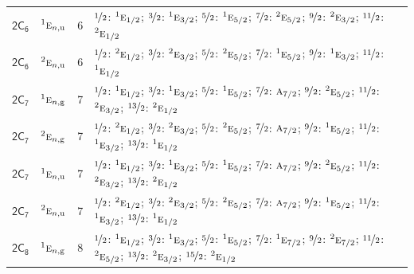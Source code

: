\documentclass[10pt,a4paper]{article}
\numberwithin{equation}{section}
\newcommand{\grp}[1]{\mathsf{#1}}
\newcommand{\irr}[1]{\text{\normalfont\scshape #1}}
\newcommand{\conjpair}[1]{{}^{#1}}
\newcommand{\ptag}[1]{\mathrm{#1}}
\newlength{\fillwidth}\newlength{\cellwidth}\newlength{\colwidth}
\begin{document}
{\begin{longtable}{@{}llr>{\RaggedRight\arraybackslash}p{\fillwidth}@{}}
\href{2C6.pdf}{$\grp{2C_{6}}$} & $\conjpair{1}\irr{e}_{n,\ptag{u}}$ & 6 & $\nicefrac{1}{2}$: $\conjpair{1}\irr{e}_{1/2}$; $\nicefrac{3}{2}$: $\conjpair{1}\irr{e}_{3/2}$; $\nicefrac{5}{2}$: $\conjpair{1}\irr{e}_{5/2}$; $\nicefrac{7}{2}$: $\conjpair{2}\irr{e}_{5/2}$; $\nicefrac{9}{2}$: $\conjpair{2}\irr{e}_{3/2}$; $\nicefrac{11}{2}$: $\conjpair{2}\irr{e}_{1/2}$\\
\href{2C6.pdf}{$\grp{2C_{6}}$} & $\conjpair{2}\irr{e}_{n,\ptag{u}}$ & 6 & $\nicefrac{1}{2}$: $\conjpair{2}\irr{e}_{1/2}$; $\nicefrac{3}{2}$: $\conjpair{2}\irr{e}_{3/2}$; $\nicefrac{5}{2}$: $\conjpair{2}\irr{e}_{5/2}$; $\nicefrac{7}{2}$: $\conjpair{1}\irr{e}_{5/2}$; $\nicefrac{9}{2}$: $\conjpair{1}\irr{e}_{3/2}$; $\nicefrac{11}{2}$: $\conjpair{1}\irr{e}_{1/2}$\\
\href{2C7.pdf}{$\grp{2C_{7}}$} & $\conjpair{1}\irr{e}_{n,\ptag{g}}$ & 7 & $\nicefrac{1}{2}$: $\conjpair{1}\irr{e}_{1/2}$; $\nicefrac{3}{2}$: $\conjpair{1}\irr{e}_{3/2}$; $\nicefrac{5}{2}$: $\conjpair{1}\irr{e}_{5/2}$; $\nicefrac{7}{2}$: $\irr{a}_{7/2}$; $\nicefrac{9}{2}$: $\conjpair{2}\irr{e}_{5/2}$; $\nicefrac{11}{2}$: $\conjpair{2}\irr{e}_{3/2}$; $\nicefrac{13}{2}$: $\conjpair{2}\irr{e}_{1/2}$\\
\href{2C7.pdf}{$\grp{2C_{7}}$} & $\conjpair{2}\irr{e}_{n,\ptag{g}}$ & 7 & $\nicefrac{1}{2}$: $\conjpair{2}\irr{e}_{1/2}$; $\nicefrac{3}{2}$: $\conjpair{2}\irr{e}_{3/2}$; $\nicefrac{5}{2}$: $\conjpair{2}\irr{e}_{5/2}$; $\nicefrac{7}{2}$: $\irr{a}_{7/2}$; $\nicefrac{9}{2}$: $\conjpair{1}\irr{e}_{5/2}$; $\nicefrac{11}{2}$: $\conjpair{1}\irr{e}_{3/2}$; $\nicefrac{13}{2}$: $\conjpair{1}\irr{e}_{1/2}$\\
\href{2C7.pdf}{$\grp{2C_{7}}$} & $\conjpair{1}\irr{e}_{n,\ptag{u}}$ & 7 & $\nicefrac{1}{2}$: $\conjpair{1}\irr{e}_{1/2}$; $\nicefrac{3}{2}$: $\conjpair{1}\irr{e}_{3/2}$; $\nicefrac{5}{2}$: $\conjpair{1}\irr{e}_{5/2}$; $\nicefrac{7}{2}$: $\irr{a}_{7/2}$; $\nicefrac{9}{2}$: $\conjpair{2}\irr{e}_{5/2}$; $\nicefrac{11}{2}$: $\conjpair{2}\irr{e}_{3/2}$; $\nicefrac{13}{2}$: $\conjpair{2}\irr{e}_{1/2}$\\
\href{2C7.pdf}{$\grp{2C_{7}}$} & $\conjpair{2}\irr{e}_{n,\ptag{u}}$ & 7 & $\nicefrac{1}{2}$: $\conjpair{2}\irr{e}_{1/2}$; $\nicefrac{3}{2}$: $\conjpair{2}\irr{e}_{3/2}$; $\nicefrac{5}{2}$: $\conjpair{2}\irr{e}_{5/2}$; $\nicefrac{7}{2}$: $\irr{a}_{7/2}$; $\nicefrac{9}{2}$: $\conjpair{1}\irr{e}_{5/2}$; $\nicefrac{11}{2}$: $\conjpair{1}\irr{e}_{3/2}$; $\nicefrac{13}{2}$: $\conjpair{1}\irr{e}_{1/2}$\\
\href{2C8.pdf}{$\grp{2C_{8}}$} & $\conjpair{1}\irr{e}_{n,\ptag{g}}$ & 8 & $\nicefrac{1}{2}$: $\conjpair{1}\irr{e}_{1/2}$; $\nicefrac{3}{2}$: $\conjpair{1}\irr{e}_{3/2}$; $\nicefrac{5}{2}$: $\conjpair{1}\irr{e}_{5/2}$; $\nicefrac{7}{2}$: $\conjpair{1}\irr{e}_{7/2}$; $\nicefrac{9}{2}$: $\conjpair{2}\irr{e}_{7/2}$; $\nicefrac{11}{2}$: $\conjpair{2}\irr{e}_{5/2}$; $\nicefrac{13}{2}$: $\conjpair{2}\irr{e}_{3/2}$; $\nicefrac{15}{2}$: $\conjpair{2}\irr{e}_{1/2}$\\

\end{longtable}}
\end{document}
